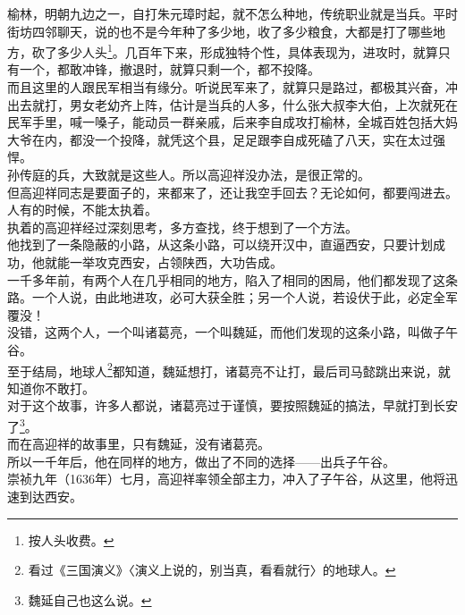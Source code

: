 \begin{multicols}{\theparacolNo}
榆林，明朝九边之一，自打朱元璋时起，就不怎么种地，传统职业就是当兵。平时街坊四邻聊天，说的也不是今年种了多少地，收了多少粮食，大都是打了哪些地方，砍了多少人头\footnote{按人头收费。}。几百年下来，形成独特个性，具体表现为，进攻时，就算只有一个，都敢冲锋，撤退时，就算只剩一个，都不投降。\\

而且这里的人跟民军相当有缘分。听说民军来了，就算只是路过，都极其兴奋，冲出去就打，男女老幼齐上阵，估计是当兵的人多，什么张大叔李大伯，上次就死在民军手里，喊一嗓子，能动员一群亲戚，后来李自成攻打榆林，全城百姓包括大妈大爷在内，都没一个投降，就凭这个县，足足跟李自成死磕了八天，实在太过强悍。\\

孙传庭的兵，大致就是这些人。所以高迎祥没办法，是很正常的。\\

但高迎祥同志是要面子的，来都来了，还让我空手回去？无论如何，都要闯进去。\\

人有的时候，不能太执着。\\

执着的高迎祥经过深刻思考，多方查找，终于想到了一个方法。\\

他找到了一条隐蔽的小路，从这条小路，可以绕开汉中，直逼西安，只要计划成功，他就能一举攻克西安，占领陕西，大功告成。\\

一千多年前，有两个人在几乎相同的地方，陷入了相同的困局，他们都发现了这条路。一个人说，由此地进攻，必可大获全胜；另一个人说，若设伏于此，必定全军覆没！\\

没错，这两个人，一个叫诸葛亮，一个叫魏延，而他们发现的这条小路，叫做子午谷。\\

至于结局，地球人\footnote{看过《三国演义》〈演义上说的，别当真，看看就行〉的地球人。}都知道，魏延想打，诸葛亮不让打，最后司马懿跳出来说，就知道你不敢打。\\

对于这个故事，许多人都说，诸葛亮过于谨慎，要按照魏延的搞法，早就打到长安了\footnote{魏延自己也这么说。}。\\

而在高迎祥的故事里，只有魏延，没有诸葛亮。\\

所以一千年后，他在同样的地方，做出了不同的选择——出兵子午谷。\\

崇祯九年（1636年）七月，高迎祥率领全部主力，冲入了子午谷，从这里，他将迅速到达西安。\\


\end{multicols}
